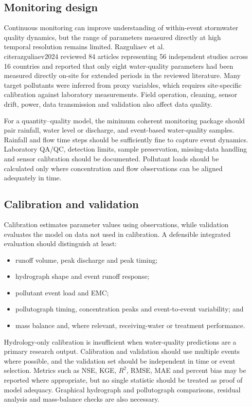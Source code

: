 \documentclass[journal]{IEEEtran}
\begin{document}
\subsection{Monitoring design}
Continuous monitoring can improve understanding of within-event stormwater quality dynamics, but the range of parameters measured directly at high temporal resolution remains limited. Razguliaev et al. \\cite{razguliaev2024} reviewed 84 articles representing 56 independent studies across 16 countries and reported that only eight water-quality parameters had been measured directly on-site for extended periods in the reviewed literature. Many target pollutants were inferred from proxy variables, which requires site-specific calibration against laboratory measurements. Field operation, cleaning, sensor drift, power, data transmission and validation also affect data quality.

For a quantity--quality model, the minimum coherent monitoring package should pair rainfall, water level or discharge, and event-based water-quality samples. Rainfall and flow time steps should be sufficiently fine to capture event dynamics. Laboratory QA/QC, detection limits, sample preservation, missing-data handling and sensor calibration should be documented. Pollutant loads should be calculated only where concentration and flow observations can be aligned adequately in time.

\subsection{Calibration and validation}
Calibration estimates parameter values using observations, while validation evaluates the model on data not used in calibration. A defensible integrated evaluation should distinguish at least:
\begin{itemize}[leftmargin=1.5em]
  \item runoff volume, peak discharge and peak timing;
  \item hydrograph shape and event runoff response;
  \item pollutant event load and EMC;
  \item pollutograph timing, concentration peaks and event-to-event variability; and
  \item mass balance and, where relevant, receiving-water or treatment performance.
\end{itemize}
Hydrology-only calibration is insufficient when water-quality predictions are a primary research output. Calibration and validation should use multiple events where possible, and the validation set should be independent in time or event selection. Metrics such as NSE, KGE, $R^2$, RMSE, MAE and percent bias may be reported where appropriate, but no single statistic should be treated as proof of model adequacy. Graphical hydrograph and pollutograph comparisons, residual analysis and mass-balance checks are also necessary.
\end{document}
